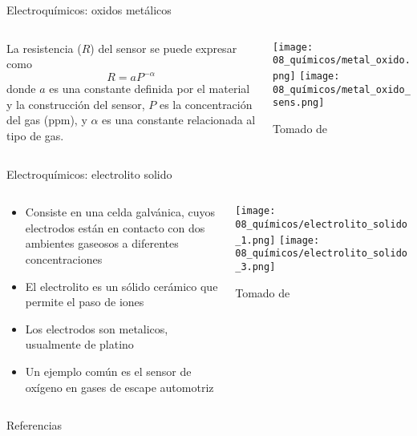 \documentclass[aspectratio=169]{beamer}
\begin{document}
\begin{frame}{Electroquímicos: oxidos metálicos}
    \begin{columns}[T, onlytextwidth]
        \begin{column}{0.55\textwidth}
            La resistencia ($R$) del sensor se puede expresar como
            \begin{equation*} 
                R = aP^{-\alpha}
            \end{equation*}
            donde $a$ es una constante definida por el material y la construcción del sensor, 
            $P$ es la concentración del gas (ppm), y $\alpha$ es una constante relacionada al tipo de gas.
        \end{column}
        \begin{column}{0.45\textwidth}
        \centering
        \texttt{[image: 08\_químicos/metal\_oxido.png]}
        \vspace*{1cm}
        \texttt{[image: 08\_químicos/metal\_oxido\_sens.png]}

        \tiny{Tomado de \cite{ida2013sensors}}
        \end{column}
    \end{columns}
\end{frame}

\begin{frame}{Electroquímicos: electrolito solido}
    \begin{columns}[T, onlytextwidth]
        \begin{column}{0.55\textwidth}
            \begin{itemize}
                \item Consiste en una celda galvánica, cuyos electrodos están en contacto
                con dos ambientes gaseosos a diferentes concentraciones
                \item El electrolito es un sólido cerámico que permite el paso de iones
                \item Los electrodos son metalicos, usualmente de platino
                \item Un ejemplo común es el sensor de oxígeno en gases de escape automotriz
            \end{itemize}
        \end{column}
        \begin{column}{0.45\textwidth}
        \centering
        \texttt{[image: 08\_químicos/electrolito\_solido\_1.png]}
        \vspace*{1cm}
        \texttt{[image: 08\_químicos/electrolito\_solido\_3.png]}

        \tiny{Tomado de \cite{ida2013sensors}}
        \end{column}
    \end{columns}
\end{frame}




\begin{frame}{Referencias}
\footnotesize
\printbibliography[heading=none]
\end{frame}
\end{document}

